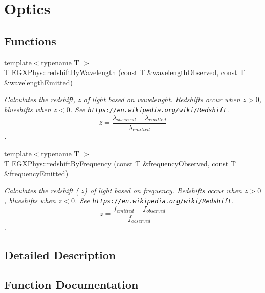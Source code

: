 \hypertarget{group___optics}{}\section{Optics}
\label{group___optics}
\subsection*{Functions}
\begin{DoxyCompactItemize}
\item 
{\footnotesize template$<$typename T $>$ }\\T \hyperlink{group___optics_ga29300a13e34da35332ca2d447b5ce82d}{E\+G\+X\+Phys\+::redshift\+By\+Wavelength} (const T \&wavelength\+Observed, const T \&wavelength\+Emitted)
\begin{DoxyCompactList}\small\item\em Calculates the redshift, $z$ of light based on wavelenght. Redshifts occur when $z > 0$, blueshifts when $z < 0$. See \href{https://en.wikipedia.org/wiki/Redshift}{\tt https\+://en.\+wikipedia.\+org/wiki/\+Redshift}. \[z=\frac{\lambda_{observed}-\lambda_{emitted}}{\lambda_{emitted}}\]. \end{DoxyCompactList}\item 
{\footnotesize template$<$typename T $>$ }\\T \hyperlink{group___optics_gacc6d3b2922061214d64b89a4b8e3967a}{E\+G\+X\+Phys\+::redshift\+By\+Frequency} (const T \&frequency\+Observed, const T \&frequency\+Emitted)
\begin{DoxyCompactList}\small\item\em Calculates the redshift ( $z$) of light based on frequency. Redshifts occur when $z > 0$, blueshifts when $z < 0$. See \href{https://en.wikipedia.org/wiki/Redshift}{\tt https\+://en.\+wikipedia.\+org/wiki/\+Redshift}. \[z=\frac{f_{emitted}-f_{observed}}{f_{observed}}\]. \end{DoxyCompactList}\end{DoxyCompactItemize}


\subsection{Detailed Description}


\subsection{Function Documentation}
\mbox{\label{group___optics_gacc6d3b2922061214d64b89a4b8e3967a}} 
